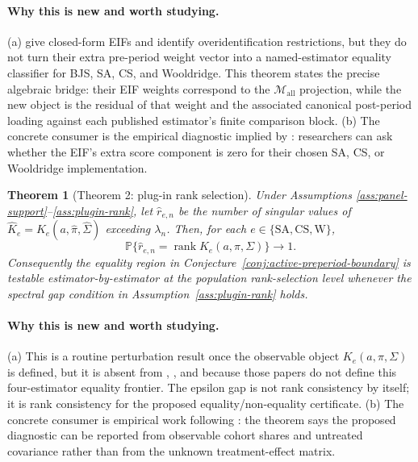 \documentclass[11pt]{article}
\renewcommand{\Pr}{\mathbb{P}}
\theoremstyle{definition}
\theoremstyle{plain}
\newtheorem{theorem}{Theorem}
\theoremstyle{remark}
\begin{document}
\paragraph{Why this is new and worth studying.}
(a) \citet{ChenSantAnnaXie2025} give closed-form EIFs and identify
overidentification restrictions, but they do not turn their extra pre-period
weight vector into a named-estimator equality classifier for BJS, SA, CS, and
Wooldridge.  This theorem states the precise algebraic bridge: their EIF
weights correspond to the \(\mathcal M_{\mathrm{all}}\) projection, while the
new object is the residual of that weight and the associated canonical
post-period loading against each published estimator's finite comparison
block.  (b) The concrete consumer is the empirical
diagnostic implied by \citet{ChenSantAnnaXie2025}: researchers can ask whether
the EIF's extra score component is zero for their chosen SA, CS, or Wooldridge
implementation.

\begin{theorem}[Theorem 2: plug-in rank selection]\label{thm:plugin-rank}
Under Assumptions \ref{ass:panel-support}--\ref{ass:plugin-rank}, let
\(\widehat r_{e,n}\) be the number of singular values of
\(\widehat K_e=K_e(a,\widehat\pi,\widehat\Sigma)\)
exceeding \(\lambda_n\).  Then, for each
\(e\in\{\mathrm{SA},\mathrm{CS},\mathrm{W}\}\),
\[
  \Pr\{\widehat r_{e,n}=\operatorname{rank}K_e(a,\pi,\Sigma)\}
  \to 1.
\]
Consequently the equality region in Conjecture~\ref{conj:active-preperiod-boundary}
is testable estimator-by-estimator at the population rank-selection level
whenever the spectral gap condition in Assumption~\ref{ass:plugin-rank} holds.
\end{theorem}

\paragraph{Why this is new and worth studying.}
(a) This is a routine perturbation result once the observable object
\(K_e(a,\pi,\Sigma)\) is defined, but it is absent from
\citet{ChenSantAnnaXie2025}, \citet{RothSantAnna2023Efficient}, and
\citet{BorusyakJaravelSpiess2024} because those papers do not define this
four-estimator equality frontier.  The epsilon gap is not rank consistency by
itself; it is rank consistency for the proposed equality/non-equality
certificate.  (b) The concrete consumer is empirical work following
\citet{RothSantAnnaBilinskiPoe2023}: the theorem says the proposed diagnostic
can be reported from observable cohort shares and untreated covariance rather
than from the unknown treatment-effect matrix.
\end{document}
